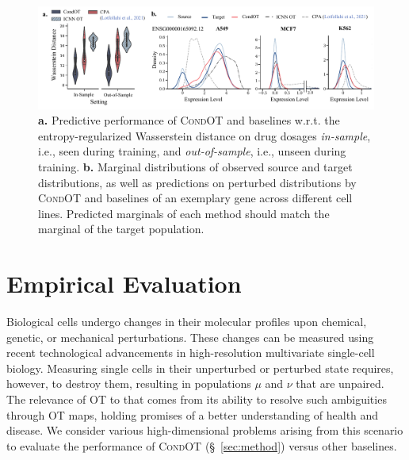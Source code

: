 \begin{figure}
    \centering
    \includegraphics[width=\textwidth]{figures/fig_sciplex_main_results.pdf}
    \caption{\textbf{a.}  Predictive performance of \textsc{CondOT} and baselines w.r.t. the entropy-regularized Wasserstein distance on drug dosages \emph{in-sample}, i.e., seen during training, and \emph{out-of-sample}, i.e., unseen during training. \textbf{b.} Marginal distributions of observed source and target distributions, as well as predictions on perturbed distributions by \textsc{CondOT} and baselines of an exemplary gene across different cell lines. Predicted marginals of each method should match the marginal of the target population.}
    \label{fig:exp_scalar_sciplex}
\end{figure}

\vspace{-5pt}
\section{Empirical Evaluation} \label{sec:condot_evaluation}
\vspace{-5pt}

 Biological cells undergo changes in their molecular profiles upon chemical, genetic, or mechanical perturbations. These changes can be measured using recent technological advancements in high-resolution multivariate single-cell biology. Measuring single cells in their unperturbed or perturbed state requires, however, to destroy them, resulting in populations $\mu$ and $\nu$ that are unpaired. The relevance of OT to that comes from its ability to resolve such ambiguities through OT maps, 
holding promises of a better understanding of health and disease. 
We consider various high-dimensional problems arising from this scenario to evaluate the performance of \textsc{CondOT} (\S~\ref{sec:method}) versus other baselines.


